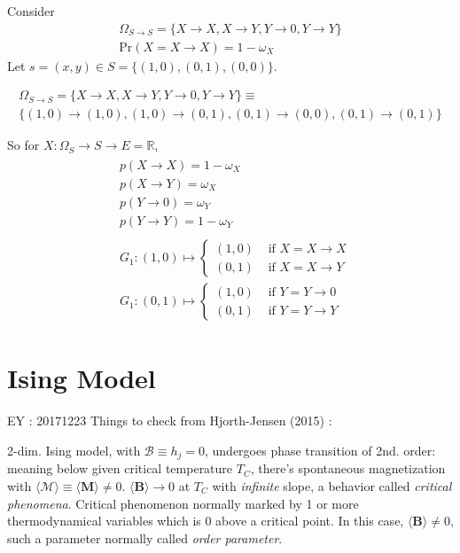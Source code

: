 \documentclass[10pt]{amsart}
\begin{document}
\begin{multicols*}{2}
Consider 
\[
\begin{gathered} 
	\Omega_{S \to S} = \lbrace X \to X, X \to Y, Y \to 0, Y \to Y \rbrace \\ 
\text{Pr}(X = X\to X) = 1- \omega_X 
\end{gathered} 
\]
Let $s=(x,y) \in S = \lbrace (1,0), (0,1), (0,0) \rbrace$.

\[
\begin{gathered} 
\Omega_{S \to S} = \lbrace X \to X, X\to Y, Y \to 0, Y \to Y \rbrace \equiv  \\
 \lbrace (1,0) \to (1,0) , (1,0) \to (0,1) , (0,1) \to (0,0), (0,1) \to (0,1) \rbrace 
\end{gathered}
\]

So for $X : \Omega_S \to S \to E = \mathbb{R}$, 
\[
\begin{gathered}
\begin{aligned} 
&	p(X\to X) = 1 - \omega_X \\ 
& p(X\to Y) = \omega_X \\
& p(Y \to 0) = \omega_Y \\
& p(Y \to Y) = 1 - \omega_Y 
\end{aligned}  \\
\begin{aligned}
& G_1 : (1,0) \mapsto \begin{cases} (1,0) & \text{ if } X = X \to X \\ (0,1) & \text{ if } X = X \to Y \end{cases} \\
& G_1 : (0,1) \mapsto \begin{cases} (1,0) & \text{ if } Y = Y \to 0 \\ (0,1) & \text{ if } Y = Y \to Y \end{cases} 
\end{aligned}
\end{gathered} 
\]

\section{Ising Model}  

EY : 20171223 Things to check from Hjorth-Jensen (2015) \cite{Hjor2015}:  

2-dim. Ising model, with $\mathcal{B} \equiv h_j =0$, undergoes phase transition of 2nd. order: meaning below given critical temperature $T_C$, there's spontaneous magnetization with $\langle \mathcal{M} \rangle \equiv \langle \mathbf{M} \rangle \neq 0$.  $\langle \mathbf{B} \rangle \to 0$ at $T_C$ with \emph{infinite} slope, a behavior called \emph{critical phenomena}.  Critical phenomenon normally marked by 1 or more thermodynamical variables which is 0 above a critical point.  In this case, $\langle \mathbf{B} \rangle \neq 0$, such a parameter normally called \emph{order parameter}.  


\end{multicols*}
\end{document}
